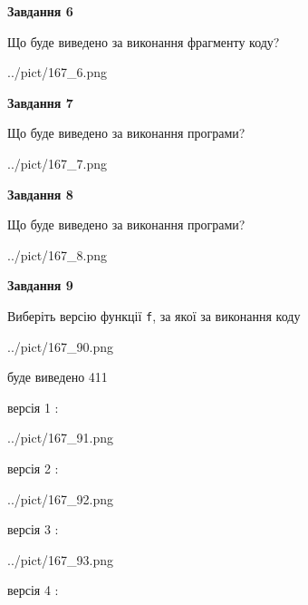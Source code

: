 \documentclass[12pt, ukrainian]{article}
\def\code#1{\Verb!#1!}
\begin{document}
{\begin {large}
{\begin {center}\textbf{Завдання 6}\end {center}}

Що буде виведено за виконання фрагменту коду?\par
\begin{center}
	{../pict/167_6.png}
\end{center}
\newpage

{\begin {center}\textbf{Завдання 7}\end {center}}

Що буде виведено за виконання програми?\par
\begin{center}
	{../pict/167_7.png}
\end{center}
\newpage

{\begin {center}\textbf{Завдання 8}\end {center}}

Що буде виведено за виконання програми?\par
\begin{center}
	{../pict/167_8.png}
\end{center}
\newpage

{\begin {center}\textbf{Завдання 9}\end {center}}

Виберіть версію функції \code{f}, за якої за виконання коду
\begin{center}
	{../pict/167_90.png}
\end{center}
буде виведено 411

\vspace{5mm}
версія 1 :

\begin{center}
	{../pict/167_91.png}
\end{center}
версія 2 :

\begin{center}
	{../pict/167_92.png}
\end{center}
версія 3 :

\begin{center}
	{../pict/167_93.png}
\end{center}
версія 4 :


\end{large}}
\end{document}
